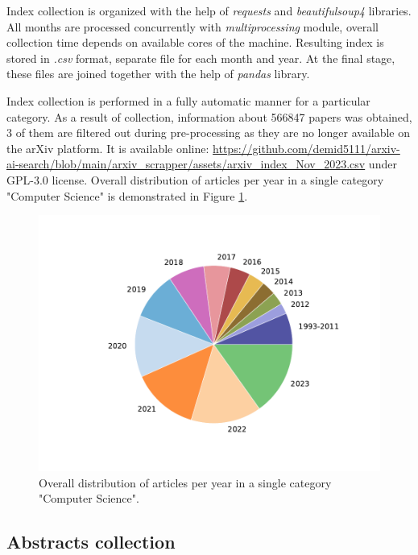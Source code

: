 \documentclass{article}
\begin{document}
        Index collection is organized with the help of \textit{requests} and \textit{beautifulsoup4} libraries. All months are processed concurrently with \textit{multiprocessing} module, overall collection time depends on available cores of the machine. Resulting index is stored in \textit{.csv} format, separate file for each month and year. At the final stage, these files are joined together with the help of \textit{pandas} library.

        Index collection is performed in a fully automatic manner for a particular category. As a result of collection, information about 566847 papers was obtained, 3 of them are filtered out during pre-processing as they are no longer available on the arXiv platform. It is available online: \url{https://github.com/demid5111/arxiv-ai-search/blob/main/arxiv_scrapper/assets/arxiv_index_Nov_2023.csv} under GPL-3.0 license. Overall distribution of articles per year in a single category "Computer Science" is demonstrated in Figure \ref{fig:articles-pie}.

        \begin{figure}[H]
            \centering
            \includegraphics[width=0.99\linewidth]{img/articles_in_every_year.pdf}
            \caption{Overall distribution of articles per year in a single category "Computer Science".}
            \label{fig:articles-pie}
        \end{figure}

    \subsection{Abstracts collection}
\end{document}
